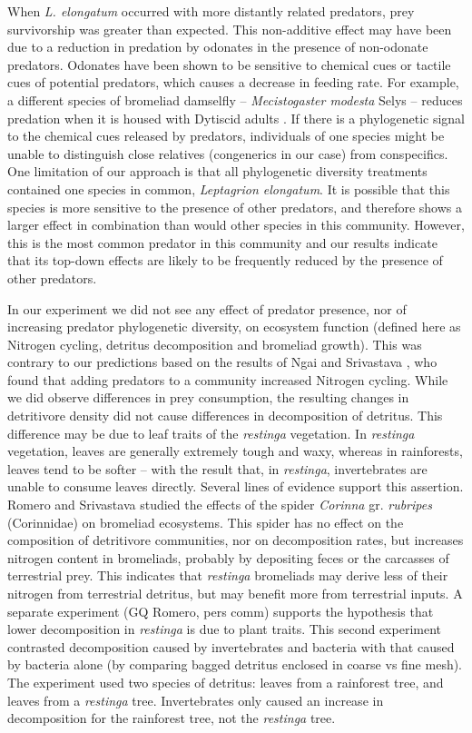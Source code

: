 \documentclass[11pt]{article}
\begin{document}
When \emph{L. elongatum} occurred with more distantly related predators,
prey survivorship was greater than expected. This non-additive effect
may have been due to a reduction in predation by odonates in the
presence of non-odonate predators. Odonates have been shown to be
sensitive to chemical cues \citealt{Barry2014} or tactile cues
\citealt{Atwood2014} of potential predators, which causes a decrease in
feeding rate. For example, a different species of bromeliad damselfly --
\emph{Mecistogaster modesta} Selys -- reduces predation when it is
housed with Dytiscid adults \citealt{Atwood2014}. If there is a
phylogenetic signal to the chemical cues released by predators,
individuals of one species might be unable to distinguish close
relatives (congenerics in our case) from conspecifics. One limitation of
our approach is that all phylogenetic diversity treatments contained one
species in common, \emph{Leptagrion elongatum}. It is possible that this
species is more sensitive to the presence of other predators, and
therefore shows a larger effect in combination than would other species
in this community. However, this is the most common predator in this
community and our results indicate that its top-down effects are likely
to be frequently reduced by the presence of other predators.

In our experiment we did not see any effect of predator presence, nor of
increasing predator phylogenetic diversity, on ecosystem function
(defined here as Nitrogen cycling, detritus decomposition and bromeliad
growth). This was contrary to our predictions based on the results of
Ngai and Srivastava \citeyearpar{Ngai2006}, who found that adding
predators to a community increased Nitrogen cycling. While we did
observe differences in prey consumption, the resulting changes in
detritivore density did not cause differences in decomposition of
detritus. This difference may be due to leaf traits of the
\emph{restinga} vegetation. In \emph{restinga} vegetation, leaves are
generally extremely tough and waxy, whereas in rainforests, leaves tend
to be softer -- with the result that, in \emph{restinga}, invertebrates
are unable to consume leaves directly. Several lines of evidence support
this assertion. Romero and Srivastava \citeyearpar{Romero2010} studied
the effects of the spider \emph{Corinna} gr. \emph{rubripes}
(Corinnidae) on bromeliad ecosystems. This spider has no effect on the
composition of detritivore communities, nor on decomposition rates, but
increases nitrogen content in bromeliads, probably by depositing feces
or the carcasses of terrestrial prey. This indicates that
\emph{restinga} bromeliads may derive less of their nitrogen from
terrestrial detritus, but may benefit more from terrestrial inputs. A
separate experiment (GQ Romero, pers comm) supports the hypothesis that
lower decomposition in \emph{restinga} is due to plant traits. This
second experiment contrasted decomposition caused by invertebrates and
bacteria with that caused by bacteria alone (by comparing bagged
detritus enclosed in coarse vs fine mesh). The experiment used two
species of detritus: leaves from a rainforest tree, and leaves from a
\emph{restinga} tree. Invertebrates only caused an increase in
decomposition for the rainforest tree, not the \emph{restinga} tree.
\end{document}
